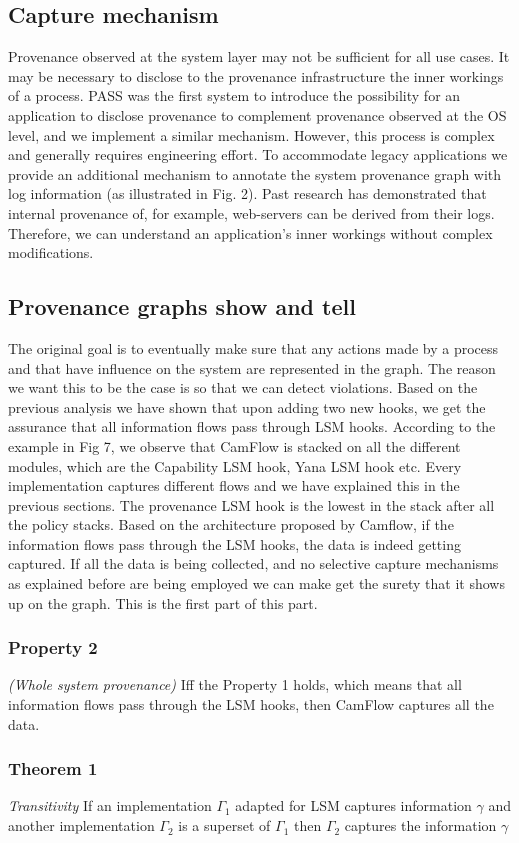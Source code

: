 \subsection{Capture mechanism}
Provenance observed at the system layer may not be sufficient
for all use cases. It may be necessary to disclose to the provenance infrastructure the inner workings of a process. PASS was
the first system to introduce the possibility for an application
to disclose provenance to complement provenance observed at
the OS level, and we implement a similar mechanism. However, this process is complex and generally requires engineering
effort. To accommodate legacy applications we provide an additional
mechanism to annotate the system provenance graph with log
information (as illustrated in Fig. 2). Past research has demonstrated that internal provenance of, for example, web-servers
can be derived from their logs. Therefore, we can understand an application’s inner workings without complex modifications.

\subsection{Provenance graphs show and tell}
The original goal is to eventually make sure that any actions made by a process and that have influence on the system are represented in the graph. The reason we want this to be the case is so that we can detect violations. Based on the previous analysis we have shown that upon adding two new hooks, we get the assurance that all information flows pass through LSM hooks. According to the example in Fig 7, we observe that CamFlow is stacked on all the different modules, which are the Capability LSM hook, Yana LSM hook etc. Every implementation captures different flows and we have explained this in the previous sections. The provenance LSM hook is the lowest in the stack after all the policy stacks. Based on the architecture proposed by Camflow, if the information flows pass through the LSM hooks, the data is indeed getting captured. If all the data is being collected, and no selective capture mechanisms as explained before are being employed we can make get the surety that it shows up on the graph. This is the first part of this part.
\vskip 0.1in
\subsubsection{Property 2}\textit{(Whole system provenance)}
\vskip 0.1in
Iff the Property 1 holds, which means that all information flows pass through the LSM hooks, then CamFlow captures all the data. 

\subsubsection{Theorem 1}\textit{Transitivity}
\vskip 0.1in
If an implementation $\Gamma_1$ adapted for LSM  captures information $\gamma$ and another implementation $\Gamma_2$ is a superset of $\Gamma_1$ then $\Gamma_2$ captures the information $\gamma$